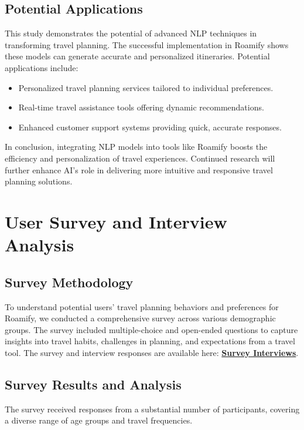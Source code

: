 \documentclass[conference]{IEEEtran}
\begin{document}
    \subsection{Potential Applications}

        This study demonstrates the potential of advanced NLP techniques in transforming travel planning. The successful implementation in Roamify shows these models can generate accurate and personalized itineraries. Potential applications include:

        \begin{itemize}
            \item Personalized travel planning services tailored to individual preferences.
            \item Real-time travel assistance tools offering dynamic recommendations.
            \item Enhanced customer support systems providing quick, accurate responses.
        \end{itemize}

        In conclusion, integrating NLP models into tools like Roamify boosts the efficiency and personalization of travel experiences. Continued research will further enhance AI's role in delivering more intuitive and responsive travel planning solutions.


\section{User Survey and Interview Analysis}

    \subsection{Survey Methodology}
        To understand potential users' travel planning behaviors and preferences for Roamify, we conducted a comprehensive survey across various demographic groups. The survey included multiple-choice and open-ended questions to capture insights into travel habits, challenges in planning, and expectations from a travel tool. The survey and interview responses are available here: \href{https://drive.google.com/drive/folders/1mKPTXZ7n7ZFmMEK6QBOKU0op3mf8hCta?usp=sharing}{\textbf{Survey Interviews}}.


    \subsection{Survey Results and Analysis}
        The survey received responses from a substantial number of participants, covering a diverse range of age groups and travel frequencies.
        \\
\end{document}
